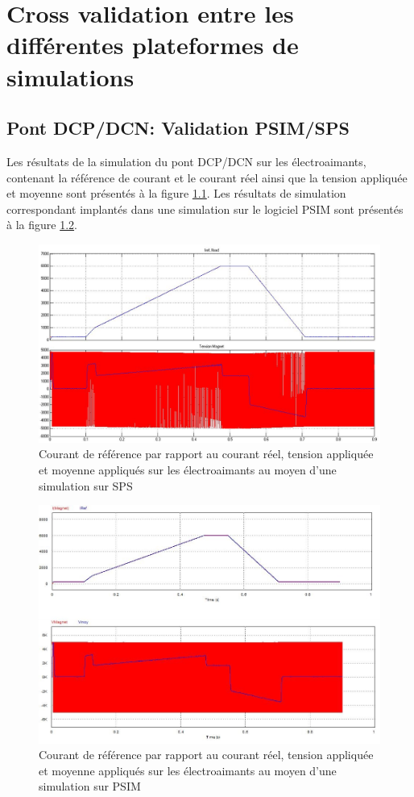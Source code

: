 \documentclass[11pt,letterpaper,final]{report}
\begin{document}
\chapter{Cross validation entre les différentes plateformes de simulations}
\section{Pont DCP/DCN: Validation PSIM/SPS}

Les résultats de la simulation du pont DCP/DCN sur les électroaimants, contenant la référence de courant et le courant réel ainsi que la tension appliquée et moyenne sont présentés à la figure \ref{figDCPDCN1}. Les résultats de simulation correspondant implantés dans une simulation sur le logiciel PSIM sont présentés à la figure \ref{figDCPDCN2}.
\begin{figure}[htb]
\centering
\includegraphics[scale=0.4]{fig/resul_sim.jpg}
\caption{Courant de référence par rapport au courant réel, tension appliquée et moyenne appliqués sur les électroaimants au moyen d'une simulation sur SPS}
\label{figDCPDCN1}
\end{figure}
\begin{figure}[htb]
\centering
\includegraphics[scale=0.6]{fig/resul_PSIM.jpg}
\caption{Courant de référence par rapport au courant réel, tension appliquée et moyenne appliqués sur les électroaimants au moyen d'une simulation sur PSIM}
\label{figDCPDCN2}
\end{figure}
\end{document}
